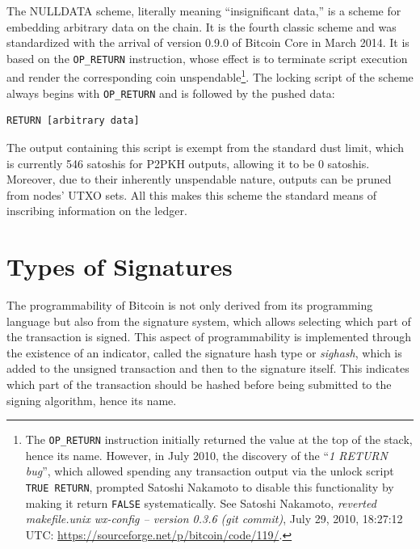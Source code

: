 \documentclass[
  a5paper,
  smalldemyvopaper,10pt,twoside,onecolumn,openright,extrafontsizes,hidelinks]{memoir}
\begin{document}
The NULLDATA scheme, literally meaning ``insignificant data,'' is a
scheme for embedding arbitrary data on the chain. It is the fourth
classic scheme and was standardized with the arrival of version 0.9.0 of
Bitcoin Core in March 2014. It is based on the \texttt{OP\_RETURN}
instruction, whose effect is to terminate script execution and render
the corresponding coin unspendable\footnote{The \texttt{OP\_RETURN}
  instruction initially returned the value at the top of the stack,
  hence its name. However, in July 2010, the discovery of the ``\emph{1
  RETURN bug}'', which allowed spending any transaction output via the
  unlock script \texttt{TRUE\ RETURN}, prompted Satoshi Nakamoto to
  disable this functionality by making it return \texttt{FALSE}
  systematically. See Satoshi Nakamoto, \emph{reverted makefile.unix
  wx-config -- version 0.3.6 (git commit)}, July 29, 2010, 18:27:12 UTC:
  \url{https://sourceforge.net/p/bitcoin/code/119/}.}. The locking
script of the scheme always begins with \texttt{OP\_RETURN} and is
followed by the pushed data:

\begin{verbatim}
RETURN [arbitrary data]
\end{verbatim}

The output containing this script is exempt from the standard dust
limit, which is currently 546 satoshis for P2PKH outputs, allowing it to
be 0 satoshis. Moreover, due to their inherently unspendable nature,
outputs can be pruned from nodes' UTXO sets. All this makes this scheme
the standard means of inscribing information on the ledger.

\section*{Types of Signatures}\label{types-of-signatures}


The programmability of Bitcoin is not only derived from its programming
language but also from the signature system, which allows selecting
which part of the transaction is signed. This aspect of programmability
is implemented through the existence of an indicator, called the
signature hash type or \emph{sighash}, which is added to the unsigned
transaction and then to the signature itself. This indicates which part
of the transaction should be hashed before being submitted to the
signing algorithm, hence its name.
\end{document}

